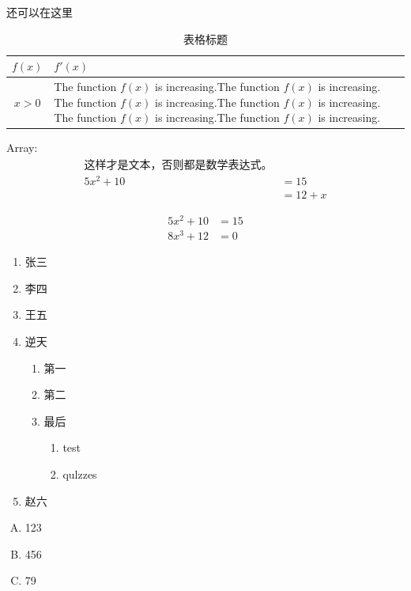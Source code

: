 \documentclass[10pt, a4paper]{article}
\begin{document}
\begin{table}[H]
    \centering  %
    \def\arraystretch{1.5}  %
\caption{还可以在这里}
\begin{tabular}{|c|p{5cm}|} %
    \hline
    $f(x)$ & $f'(x)$    \\  \hline
    $x > 0$ & The function $f(x)$ is increasing.The function $f(x)$ is increasing.
    The function $f(x)$ is increasing.The function $f(x)$ is increasing.
    The function $f(x)$ is increasing.The function $f(x)$ is increasing.  \\  \hline
\end{tabular}
\caption{表格标题}
\end{table}

Array:
\begin{align*}
    \text{这样才是文本，否则都是数学表达式。}   \\
    5x^2 + 10 &= 15\\
    &=12+x
\end{align*}

\begin{align}
    5x^2 + 10 &= 15\\   %
    8x^3 + 12 &= 0
\end{align}

\vspace{1cm}

\begin{enumerate}
    \item 张三
    \item 李四
    \item 王五
    \item 逆天
        \begin{enumerate}
            \item 第一
            \item 第二
            \item 最后
                \begin{enumerate}
                    \item test
                    \item qulzzes
                \end{enumerate}
        \end{enumerate}
    \item 赵六
\end{enumerate}

\begin{enumerate}[A.]
    \item 123
    \item 456
    \item 79
\end{enumerate}
\end{document}
